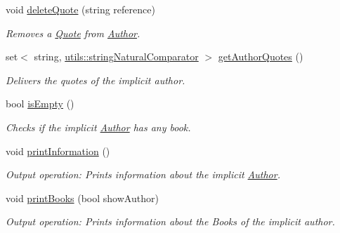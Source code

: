 \begin{DoxyCompactItemize}
void \hyperlink{class_author_a41078931f76f02641f92521a3da5b286}{delete\+Quote} (string reference)
\begin{DoxyCompactList}\small\item\em Removes a \hyperlink{class_quote}{Quote} from \hyperlink{class_author}{Author}. \end{DoxyCompactList}\item 
set$<$ string, \hyperlink{structutils_1_1string_natural_comparator}{utils\+::string\+Natural\+Comparator} $>$ \hyperlink{class_author_ab6de48a5cae0c2f2b9a2b09d9106504b}{get\+Author\+Quotes} ()
\begin{DoxyCompactList}\small\item\em Delivers the quotes of the implicit author. \end{DoxyCompactList}\item 
bool \hyperlink{class_author_ab0752a3f061a07c6460e52e4386ea5c3}{is\+Empty} ()
\begin{DoxyCompactList}\small\item\em Checks if the implicit \hyperlink{class_author}{Author} has any book. \end{DoxyCompactList}\item 
void \hyperlink{class_author_a9dff52e2a8bd67ff4509eb00f9235155}{print\+Information} ()
\begin{DoxyCompactList}\small\item\em Output operation\+: Prints information about the implicit \hyperlink{class_author}{Author}. \end{DoxyCompactList}\item 
void \hyperlink{class_author_a01c49b9a75e0651c9ebbe4e841d18ae9}{print\+Books} (bool show\+Author)
\begin{DoxyCompactList}\small\item\em Output operation\+: Prints information about the Books of the implicit author. \end{DoxyCompactList}\end{DoxyCompactItemize}
